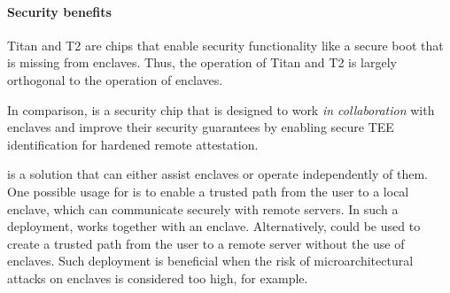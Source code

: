 \paragraph{Security benefits}
Titan and T2 are chips that enable security functionality like a secure boot that is missing from enclaves. Thus, the operation of Titan and T2 is largely orthogonal to the operation of enclaves. 

In comparison, \proximitee is a security chip that is designed to work \emph{in collaboration} with enclaves and improve their security guarantees by enabling secure TEE identification for hardened remote attestation. 

\protection is a solution that can either assist enclaves or operate independently of them. One possible usage for \protection is to enable a trusted path from the user to a local enclave, which can communicate securely with remote servers. In such a deployment, \protection works together with an enclave. 
%
Alternatively, \protection could be used to create a trusted path from the user to a remote server without the use of enclaves. Such deployment is beneficial when the risk of microarchitectural attacks on enclaves is considered too high, for example.


